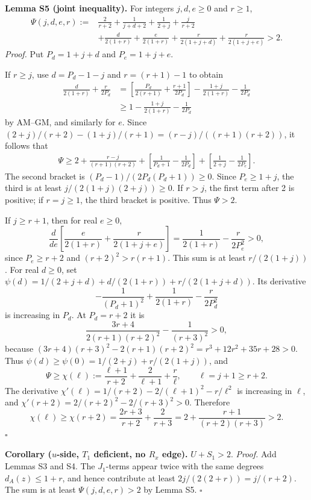 \textbf{Lemma S5 (joint inequality).} For integers $j,d,e\ge0$ and $r\ge1$,
\[
\begin{aligned}
 \Psi(j,d,e,r):={}&\frac2{r+2}+\frac1{j+d+2}+\frac1{2+j}+\frac j{r+2}\\
 &+\frac d{2(1+r)}+\frac e{2(1+r)}
   +\frac r{2(1+j+d)}+\frac r{2(1+j+e)}>2.
\end{aligned}
\]
\emph{Proof.} Put $P_d=1+j+d$ and $P_e=1+j+e$.

If $r\ge j$, use $d=P_d-1-j$ and $r=(r+1)-1$ to obtain
\[
\begin{aligned}
 \frac d{2(1+r)}+\frac r{2P_d}
 &=\left[\frac{P_d}{2(r+1)}+\frac{r+1}{2P_d}\right]
    -\frac{1+j}{2(1+r)}-\frac1{2P_d}\\
 &\ge1-\frac{1+j}{2(1+r)}-\frac1{2P_d}
\end{aligned}
\]
by AM--GM, and similarly for $e$. Since
$(2+j)/(r+2)-(1+j)/(r+1)=(r-j)/((r+1)(r+2))$, it follows that
\[
\begin{aligned}
 \Psi\ge2+\frac{r-j}{(r+1)(r+2)}
 +\left[\frac1{P_d+1}-\frac1{2P_d}\right]
 +\left[\frac1{2+j}-\frac1{2P_e}\right].
\end{aligned}
\]
The second bracket is $(P_d-1)/(2P_d(P_d+1))\ge0$. Since $P_e\ge1+j$, the third is at least $j/(2(1+j)(2+j))\ge0$. If $r>j$, the first term after 2 is positive; if $r=j\ge1$, the third bracket is positive. Thus $\Psi>2$.

If $j\ge r+1$, then for real $e\ge0$,
\[
 \frac{d}{de}\left[\frac e{2(1+r)}+\frac r{2(1+j+e)}\right]
 =\frac1{2(1+r)}-\frac r{2P_e^2}>0,
\]
since $P_e\ge r+2$ and $(r+2)^2>r(r+1)$. This sum is at least $r/(2(1+j))$. For real $d\ge0$, set $\psi(d)=1/(2+j+d)+d/(2(1+r))+r/(2(1+j+d))$. Its derivative
\[
 -\frac1{(P_d+1)^2}+\frac1{2(1+r)}-\frac r{2P_d^2}
\]
is increasing in $P_d$. At $P_d=r+2$ it is
\[
 \frac{3r+4}{2(r+1)(r+2)^2}-\frac1{(r+3)^2}>0,
\]
because $(3r+4)(r+3)^2-2(r+1)(r+2)^2=r^3+12r^2+35r+28>0$. Thus $\psi(d)\ge\psi(0)=1/(2+j)+r/(2(1+j))$, and
\[
 \Psi\ge\chi(\ell):=\frac{\ell+1}{r+2}+\frac2{\ell+1}+\frac r\ell,
 \qquad \ell=j+1\ge r+2.
\]
The derivative $\chi'(\ell)=1/(r+2)-2/(\ell+1)^2-r/\ell^2$ is increasing in $\ell$, and $\chi'(r+2)=2/(r+2)^2-2/(r+3)^2>0$. Therefore
\[
 \chi(\ell)\ge\chi(r+2)=\frac{2r+3}{r+2}+\frac2{r+3}
 =2+\frac{r+1}{(r+2)(r+3)}>2.
\]
\hfill$\square$

\textbf{Corollary ($u$-side, $T_1$ deficient, no $R_x$ edge).} $U+S_1>2$.
\emph{Proof.} Add Lemmas S3 and S4. The $J_1$-terms appear twice with the same degrees $d_A(z)\le1+r$, and hence contribute at least $2j/(2(2+r))=j/(r+2)$. The sum is at least $\Psi(j,d,e,r)>2$ by Lemma S5. \hfill$\square$

